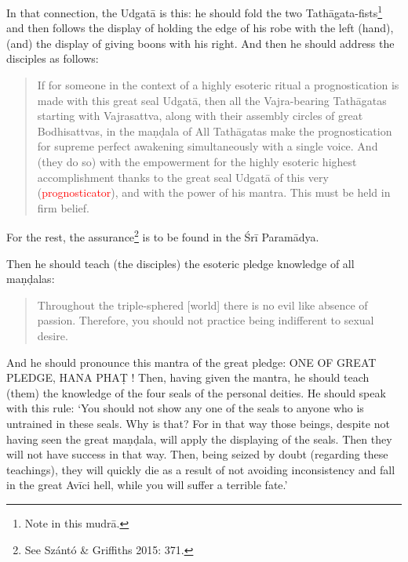 \documentclass[11pt]{book}
\makeatletter
\def\fakesc#1{%
  \begingroup%
  \xdef\fake@name{\csname\curr@fontshape/\f@size\endcsname}%
  \fontsize{1.3\fontdimen8\fake@name}{\baselineskip}\selectfont%
  \uppercase{#1}%
  \endgroup%
}
\newcommand{\mantra}[1]{\fakesc{#1}}
\newcommand{\red}[1]{\textcolor{red}{#1}}
\makeatother
\begin{document}
In that connection, the Udgatā is this: he should fold the two Tathāgata-fists\footnote{Note in this mudrā.} and then follows the display of holding the edge of his robe with the left (hand), (and) the display of giving boons with his right. And then he should address the disciples as follows:

\begin{verse}
If for someone in the context of a highly esoteric ritual a prognostication is made with this great seal Udgatā, then all the Vajra-bearing Tathāgatas starting with Vajrasattva, along with their assembly circles of great Bodhisattvas, in the maṇḍala of All Tathāgatas make the prognostication for  supreme perfect awakening simultaneously with a single voice. And (they do so) with the empowerment for the highly esoteric highest accomplishment thanks to the great seal Udgatā of this very (\red{prognosticator}), and with the power of his mantra. This must be held in firm belief.
\end{verse}

For the rest, the assurance\footnote{See Szántó \& Griffiths 2015: 371.} is to be found in the Śrī Paramādya.

Then he should teach (the disciples) the esoteric pledge knowledge of all maṇḍalas:

\begin{verse}
Throughout the triple-sphered [world] there is no evil like absence of passion. Therefore, you should not practice being indifferent to sexual desire.
\end{verse}%

And he should pronounce this mantra of the great pledge: \mantra{one of great pledge, hana phaṭ}! Then, having given the mantra, he should teach (them) the knowledge of the four seals of the personal deities. He should speak with this rule: `You should not show any one of the seals to anyone who is untrained in these seals. Why is that? For in that way those beings, despite not having seen the great maṇḍala, will apply the displaying of the seals. Then they will not have success in that way. Then, being seized by doubt (regarding these teachings), they will quickly die as a result of not avoiding inconsistency and fall in the great Avīci hell, while you will suffer a terrible fate.'  
\end{document}
